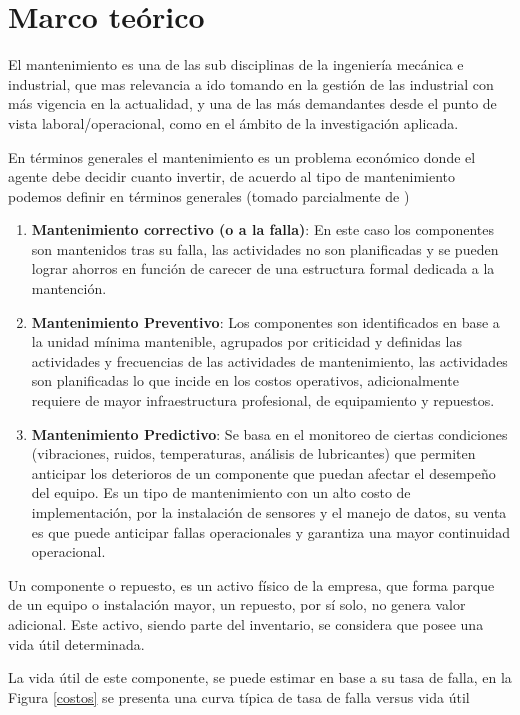 \documentclass{article}
\begin{document}
\section{Marco teórico}

El mantenimiento es una de las sub disciplinas de la ingeniería mecánica e industrial, que mas relevancia a ido tomando en la gestión de las industrial con más vigencia en la actualidad, y una de las más demandantes desde el punto de vista laboral/operacional, como en el ámbito de la investigación aplicada.

En términos generales el mantenimiento es un problema económico donde el agente debe decidir cuanto invertir, de acuerdo al tipo de mantenimiento podemos definir en términos generales (tomado parcialmente de \cite{lib1:T1})

\begin{enumerate}

\item \textbf{Mantenimiento correctivo (o a la falla)}: En este caso los componentes son mantenidos tras su falla, las actividades no son planificadas y se pueden lograr ahorros en función de carecer de una estructura formal dedicada a la mantención.
\item \textbf{Mantenimiento Preventivo}: Los componentes son identificados en base a la unidad mínima mantenible, agrupados por criticidad y definidas las actividades y frecuencias de las actividades de mantenimiento, las actividades son planificadas lo que incide en los costos operativos, adicionalmente requiere de mayor infraestructura profesional, de equipamiento y repuestos.
\item \textbf{Mantenimiento Predictivo}: Se basa en el monitoreo de ciertas condiciones (vibraciones, ruidos, temperaturas, análisis de lubricantes) que permiten anticipar los deterioros de un componente que puedan afectar el desempeño del equipo. Es un tipo de mantenimiento con un alto costo de implementación, por la instalación de sensores y el manejo de datos, su venta es que puede anticipar fallas operacionales y garantiza una mayor continuidad operacional.
 \end{enumerate}

Un componente o repuesto, es un activo físico de la empresa, que forma parque de un equipo o instalación mayor, un repuesto, por sí solo, no genera valor adicional. Este activo, siendo parte del inventario, se considera que posee una vida útil determinada. 

La vida útil de este componente, se puede estimar en base a su tasa de falla, en la Figura \ref{costos} se presenta una curva típica de tasa de falla versus vida útil
\end{document}
